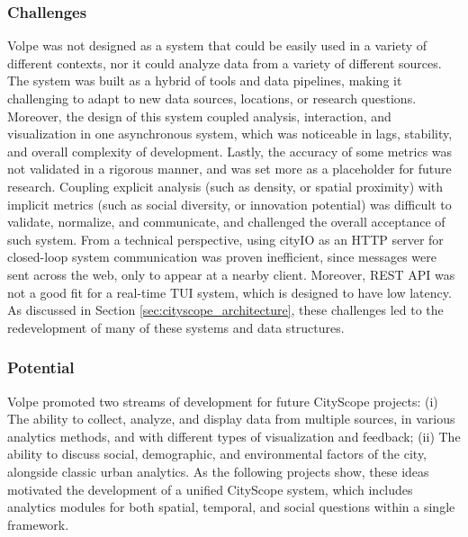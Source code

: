 {{        \subsubsection{Challenges}

        {
            Volpe was not designed as a system that could be easily used in a variety of different contexts, nor it could analyze data from a variety of different sources. The system was built as a hybrid of tools and data pipelines, making it challenging to adapt to new data sources, locations, or research questions. Moreover, the design of this system coupled analysis, interaction, and visualization in one asynchronous system, which was noticeable in lags, stability, and overall complexity of development.
            Lastly, the accuracy of some metrics was not validated in a rigorous manner, and was set more as a placeholder for future research. Coupling explicit analysis (such as density, or spatial proximity) with implicit metrics (such as social diversity, or innovation potential) was difficult to validate, normalize, and communicate, and challenged the overall acceptance of such system.
            \newline
            From a technical perspective, using cityIO as an HTTP server for closed-loop system communication was proven inefficient, since messages were sent across the web, only to appear at a nearby client. Moreover, REST API was not a good fit for a real-time TUI system, which is designed to have low latency. As discussed in Section \eqref{sec:cityscope_architecture}, these challenges led to the redevelopment of many of these systems and data structures.
        }

        \subsubsection{Potential}
        {
            Volpe promoted two streams of development for future CityScope projects: (i) The ability to collect, analyze, and display data from multiple sources, in various analytics methods, and with different types of visualization and feedback; (ii) The ability to discuss social, demographic, and environmental factors of the city, alongside classic urban analytics. As the following projects show, these ideas motivated the development of a unified CityScope system, which includes analytics modules for both spatial, temporal, and social questions within a single framework.
        }

    }
}












